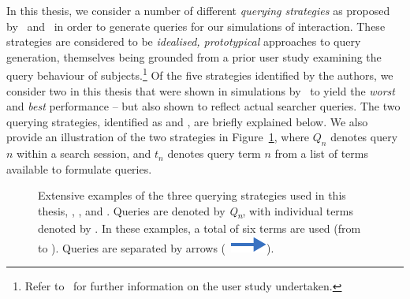 In this thesis, we consider a number of different \emph{querying strategies} as proposed by~\cite{keskustalo2009querying} and~\cite{baskaya2013behavioural_factors} in order to generate queries for our simulations of interaction. These strategies are considered to be \emph{idealised, prototypical} approaches to query generation, themselves being grounded from a prior user study examining the query behaviour of subjects.\footnote{Refer to~\cite{keskustalo2009querying} for further information on the user study undertaken.} Of the five strategies identified by the authors, we consider two in this thesis that were shown in simulations by~\cite{keskustalo2009querying} to yield the \emph{worst} and \emph{best} performance -- but also shown to reflect actual searcher queries. The two querying strategies, identified as  and , are briefly explained below. We also provide an illustration of the two strategies in Figure~\ref{fig:querying}, where $Q_n$ denotes query $n$ within a search session, and $t_n$ denotes query term $n$ from a list of terms available to formulate queries.

\begin{figure}[t!]
    \centering
    \caption[Querying strategies ,  and ]{Extensive examples of the three querying strategies used in this thesis, , , and . Queries are denoted by \emph{Q\textsubscript{n}}, with individual terms denoted by . In these examples, a total of six terms are used (from  to ). Queries are separated by arrows (~\includegraphics[height=\fontcharht\font`\d]{figures/src/arrow-blue-right.pdf}).}
    \label{fig:querying}
\end{figure}


